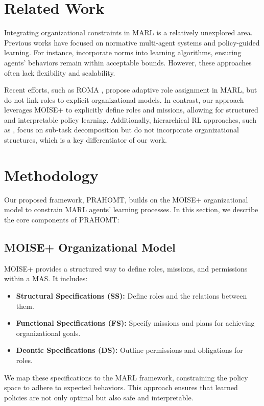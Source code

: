 \documentclass[sigconf,anonymous]{aamas}
\begin{document}
\section{Related Work}
\label{sec:related-work}
Integrating organizational constraints in MARL is a relatively unexplored area. Previous works have focused on normative multi-agent systems and policy-guided learning. For instance, \cite{norms} incorporate norms into learning algorithms, ensuring agents' behaviors remain within acceptable bounds. However, these approaches often lack flexibility and scalability.

Recent efforts, such as ROMA \cite{roma}, propose adaptive role assignment in MARL, but do not link roles to explicit organizational models. In contrast, our approach leverages MOISE+ to explicitly define roles and missions, allowing for structured and interpretable policy learning. Additionally, hierarchical RL approaches, such as \cite{hierarchicalRL}, focus on sub-task decomposition but do not incorporate organizational structures, which is a key differentiator of our work.

\section{Methodology}
\label{sec:methodology}
Our proposed framework, PRAHOMT, builds on the MOISE+ organizational model to constrain MARL agents' learning processes. In this section, we describe the core components of PRAHOMT:

\subsection{MOISE+ Organizational Model}
MOISE+ provides a structured way to define roles, missions, and permissions within a MAS. It includes:
\begin{itemize}
    \item \textbf{Structural Specifications (SS):} Define roles and the relations between them.
    \item \textbf{Functional Specifications (FS):} Specify missions and plans for achieving organizational goals.
    \item \textbf{Deontic Specifications (DS):} Outline permissions and obligations for roles.
\end{itemize}
We map these specifications to the MARL framework, constraining the policy space to adhere to expected behaviors. This approach ensures that learned policies are not only optimal but also safe and interpretable.
\end{document}
